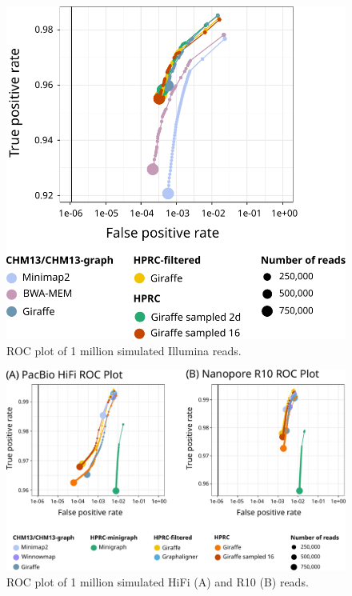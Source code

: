 \documentclass[11pt]{ucscthesis}
\begin{document}
\begin{figure}[htb]
    \centering
    \includegraphics[width=0.8\linewidth]{lr_roc_illumina.pdf}
    \caption[Illumina ROC]{ROC plot of 1 million simulated Illumina reads.}
    \label{fig:roc-illumina}
\end{figure}

\begin{figure}
    \centering
    \includegraphics[width=\linewidth]{lr_rocs.pdf}
    \caption[HiFi and R10 ROCs]{ROC plot of 1 million simulated HiFi (A) and R10 (B) reads.}
    \label{fig:roc_hifi_r10}
\end{figure}
\end{document}
